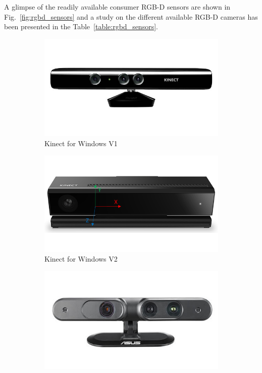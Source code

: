 	 A glimpse of the readily available consumer RGB-D sensors are shown in Fig.~\ref{fig:rgbd_sensors} and a study on the different available RGB-D cameras has been presented in the Table~\ref{table:rgbd_sensors}.
\begin{figure}
\centering
\begin{subfigure}[b]{0.33\textwidth}
\includegraphics[width=\textwidth]{assets/kinectv1.jpg}
\caption{Kinect for Windows V1}
\label{fig:kinectv1}
\end{subfigure}%
\begin{subfigure}[b]{0.33\textwidth}
\includegraphics[width=\textwidth]{assets/kinectv2_2.png}
\caption{Kinect for Windows V2}
\label{fig:kinectv2}
\end{subfigure}%
\begin{subfigure}[b]{0.33\textwidth}
\includegraphics[width=\textwidth]{assets/asus_xtion.jpg}

\end{subfigure}
\end{figure}
